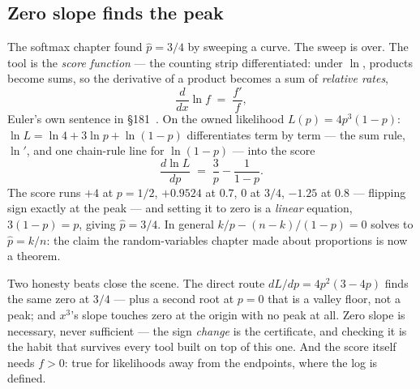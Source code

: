 \begin{narrative}
\section{Zero slope finds the peak}

The softmax chapter found $\hat{p} = 3/4$ by sweeping a curve. The
sweep is over. The tool is the \emph{score function} — the counting
strip differentiated: under $\ln$, products become sums, so the
derivative of a product becomes a sum of \emph{relative rates},
\[
  \frac{d}{dx} \ln f \;=\; \frac{f'}{f} ,
\]
Euler's own sentence in
\S181~\cite{calculus-leonhard-euler-institutiones-calculi-differentialis-i-vi-bru}.
On the owned likelihood $L(p) = 4p^3(1-p)$:
$\ln L = \ln 4 + 3 \ln p + \ln(1-p)$ differentiates term by term —
the sum rule, $\ln'$, and one chain-rule line for $\ln(1-p)$ — into
the score
\[
  \frac{d \ln L}{dp} \;=\; \frac{3}{p} - \frac{1}{1-p} .
\]
The score runs $+4$ at $p = 1/2$, $+0.9524$ at $0.7$, $0$ at $3/4$,
$-1.25$ at $0.8$ — flipping sign exactly at the peak — and setting
it to zero is a \emph{linear} equation, $3(1-p) = p$, giving
$\hat{p} = 3/4$. In general $k/p - (n-k)/(1-p) = 0$ solves to
$\hat{p} = k/n$: the claim the random-variables chapter made about
proportions is now a theorem.

\begin{center}
\end{center}

Two honesty beats close the scene. The direct route
$dL/dp = 4p^2(3 - 4p)$ finds the same zero at $3/4$ — plus a second
root at $p = 0$ that is a valley floor, not a peak; and $x^3$'s slope
touches zero at the origin with no peak at all. Zero slope is
necessary, never sufficient — the sign \emph{change} is the
certificate, and checking it is the habit that survives every tool
built on top of this one. And the score itself needs $f > 0$: true
for likelihoods away from the endpoints, where the log is defined.


\end{narrative}
